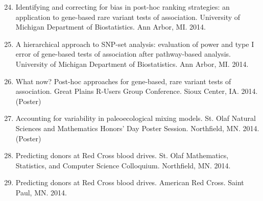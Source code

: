 \documentclass[margin]{res}
\newenvironment{benumerate}[1]{
    \let\oldItem\item
    \def\item{\addtocounter{enumi}{-2}\oldItem}
    
    \begin{enumerate}
    \setcounter{enumi}{#1}
    \addtocounter{enumi}{1}
}{
    \end{enumerate}
}
\begin{document}
\begin{resume}
\begin{benumerate}{23}
\item %
Identifying and correcting for bias in post-hoc ranking strategies: an application to gene-based rare variant tests of association. University of Michigan Department of Biostatistics. Ann Arbor, MI. 2014.

\item %
A hierarchical approach to SNP-set analysis: evaluation of power and type I error of gene-based tests of association after pathway-based analysis. University of Michigan Department of Biostatistics. Ann Arbor, MI. 2014.


\item %
What now? Post-hoc approaches for gene-based, rare variant tests of association. Great Plains R-Users Group Conference. Sioux Center, IA. 2014. (Poster)

\item %
Accounting for variability in paleoecological mixing models. St. Olaf Natural Sciences and Mathematics Honors’ Day Poster Session. Northfield, MN. 2014. (Poster)


\item %
Predicting donors at Red Cross blood drives. St. Olaf Mathematics, Statistics, and Computer Science Colloquium. Northfield, MN. 2014.

\item %
Predicting donors at Red Cross blood drives. American Red Cross. Saint Paul, MN. 2014.%



\end{benumerate}
\end{resume}
\end{document}
